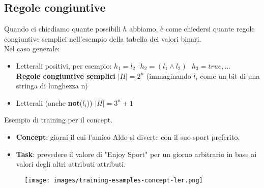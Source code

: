 \subsection{Regole congiuntive}
Quando ci chiediamo quante possibili $h$ abbiamo, è come chiedersi quante regole congiuntive semplici nell'esempio della tabella dei valori binari.\\
Nel caso generale:
\begin{itemize}
    \item Letterali positivi, per esempio: $h_1 = l_2 \:\:\: h_2 = (l_1 \land l_2) \:\:\: h_3 = true, \dots$\\
    \textbf{Regole congiuntive semplici} $|H| = 2^n$ (immaginando $l_i$ come un bit di una stringa di lunghezza n)
    \item Letterali (anche \textbf{not}($l_i$)) \hspace{15pt} $|H| = 3^n + 1$
\end{itemize}
\begin{example}
    Esempio di training per il concept.
    \begin{itemize}
        \item \textbf{Concept}: giorni il cui l'amico Aldo si diverte con il suo sport preferito.
        \item \textbf{Task}: prevedere il valore di "Enjoy Sport" per un giorno arbitrario in base ai valori degli altri attributi attributi.
    \end{itemize}
    \begin{figure}[h!]
        \centering
        \texttt{[image: images/training-esamples-concept-ler.png]}
    \end{figure}
\end{example}
